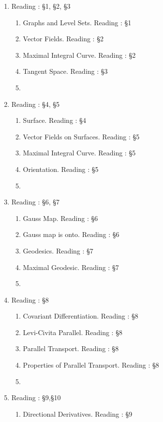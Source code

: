 \begin{enumerate}[label=Week \arabic*]
	\item Reading : \S1, \S2, \S3
	\begin{enumerate}[label=Day \arabic*]
		\item Graphs and Level Sets. Reading : \S1
		\item Vector Fields. Reading : \S2
		\item Maximal Integral Curve. Reading : \S2
		\item Tangent Space. Reading : \S3
		\item 
	\end{enumerate}
	\item Reading : \S4, \S5
	\begin{enumerate}[label=Day \arabic*]
		\item Surface. Reading : \S4
		\item Vector Fields on Surfaces. Reading : \S5
		\item Maximal Integral Curve. Reading : \S5
		\item Orientation. Reading : \S5
		\item
	\end{enumerate}
	\item Reading : \S6, \S7
	\begin{enumerate}[label=Day \arabic*]
		\item Gauss Map. Reading : \S6
		\item Gauss map is onto. Reading : \S6
		\item Geodesics. Reading : \S7
		\item Maximal Geodesic. Reading : \S7
		\item
	\end{enumerate}
	\item Reading : \S8
	\begin{enumerate}[label=Day \arabic*]
		\item Covariant Differentiation. Reading : \S8
		\item Levi-Civita Parallel. Reading : \S8
		\item Parallel Transport. Reading : \S8
		\item Properties of Parallel Transport. Reading : \S8
		\item
	\end{enumerate}
	\item Reading : \S9,\S10
	\begin{enumerate}[label=Day \arabic*]
		\item Directional Derivatives. Reading : \S9

\end{enumerate}
\end{enumerate}
